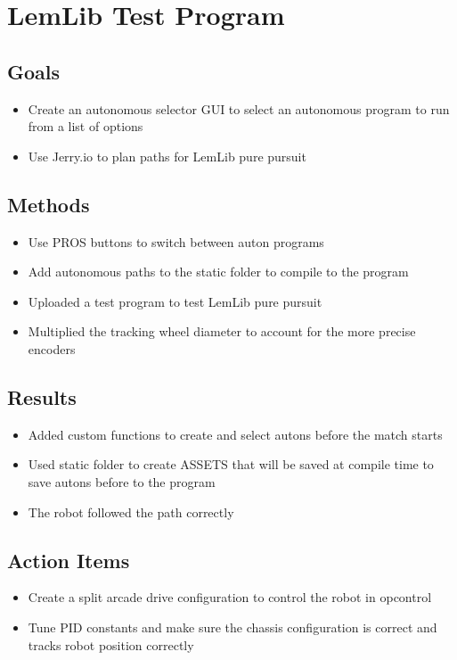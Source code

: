 \section{LemLib Test Program}

\subsection{Goals}
\begin{itemize}
    \item Create an autonomous selector GUI to select an autonomous program to run from a list of options
    \item Use Jerry.io to plan paths for LemLib pure pursuit
\end{itemize}

\subsection{Methods}
\begin{itemize}
    \item Use PROS buttons to switch between auton programs
    \item Add autonomous paths to the static folder to compile to the program
    \item Uploaded a test program to test LemLib pure pursuit
    \item Multiplied the tracking wheel diameter to account for the more precise encoders
\end{itemize}

\subsection{Results}
\begin{itemize}
    \item Added custom functions to create and select autons before the match starts
    \item Used static folder to create ASSETS that will be saved at compile time to save autons before to the program
    \item The robot followed the path correctly 
\end{itemize}

\subsection{Action Items}
\begin{itemize}
    \item Create a split arcade drive configuration to control the robot in opcontrol
    \item Tune PID constants and make sure the chassis configuration is correct and tracks robot position correctly
\end{itemize}
